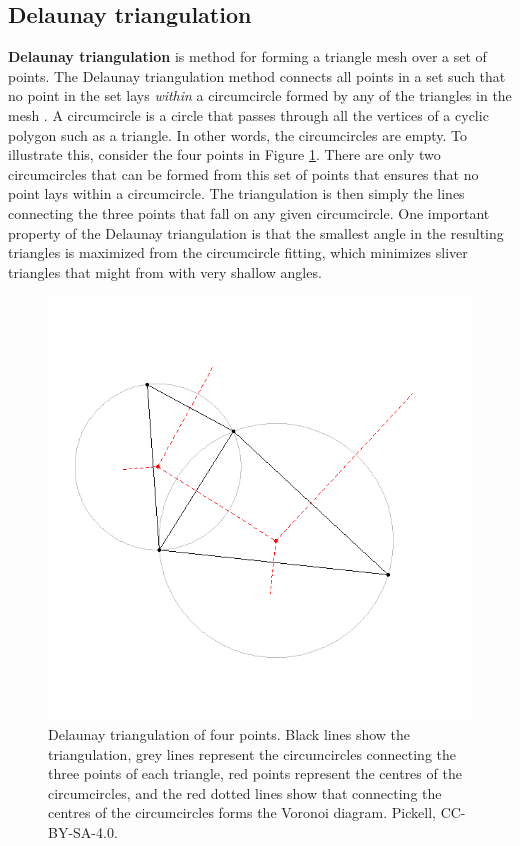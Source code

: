 \documentclass[
]{book}
\begin{document}
\subsection{Delaunay triangulation}\label{delaunay-triangulation}

\textbf{Delaunay triangulation} is method for forming a triangle mesh over a set of points. The Delaunay triangulation method connects all points in a set such that no point in the set lays \emph{within} a circumcircle formed by any of the triangles in the mesh \citep{delaunay_sur_1934}. A circumcircle is a circle that passes through all the vertices of a cyclic polygon such as a triangle. In other words, the circumcircles are empty. To illustrate this, consider the four points in Figure \ref{fig:7-delaunay-triangulation-circumcircles}. There are only two circumcircles that can be formed from this set of points that ensures that no point lays within a circumcircle. The triangulation is then simply the lines connecting the three points that fall on any given circumcircle. One important property of the Delaunay triangulation is that the smallest angle in the resulting triangles is maximized from the circumcircle fitting, which minimizes sliver triangles that might from with very shallow angles.

\begin{figure}
\includegraphics[width=0.75\linewidth]{images/07-delaunay-triangulation-circumcircles} \caption{Delaunay triangulation of four points. Black lines show the triangulation, grey lines represent the circumcircles connecting the three points of each triangle, red points represent the centres of the circumcircles, and the red dotted lines show that connecting the centres of the circumcircles forms the Voronoi diagram. Pickell, CC-BY-SA-4.0.}\label{fig:7-delaunay-triangulation-circumcircles}
\end{figure}
\end{document}
